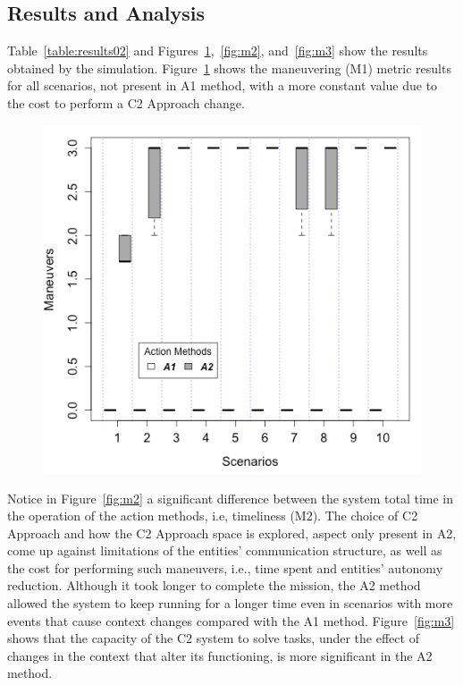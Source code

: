 \subsection{Results and Analysis}

Table~\ref{table:results02} and Figures~\ref{fig:m1},~\ref{fig:m2}, and~\ref{fig:m3} show the results obtained by the simulation. Figure~\ref{fig:m1} shows the maneuvering (M1) metric results for all scenarios, not present in A1 method, with a more constant value due to the cost to perform a C2 Approach change.

\begin{figure}[ht]
\centering
\begin{minipage}{.5\textwidth}
    \centering
    \small
    \fontsize{7}{7}\selectfont
    \label{table:results02}
    
\end{minipage}%
\begin{minipage}{.5\textwidth}
  \centering
  \includegraphics[width=0.95\linewidth]{figures/graphs/Boxplot_M2.png}
  \label{fig:m1}
\end{minipage}
\end{figure}

Notice in Figure~\ref{fig:m2} a significant difference between the system total time in the operation of the action methods, i.e, timeliness (M2). The choice of C2 Approach and how the C2 Approach space is explored, aspect only present in A2, come up against limitations of the entities' communication structure, as well as the cost for performing such maneuvers, i.e., time spent and entities' autonomy reduction. Although it took longer to complete the mission, the A2 method allowed the system to keep running for a longer time even in scenarios with more events that cause context changes compared with the A1 method. Figure~\ref{fig:m3} shows that the capacity of the C2 system to solve tasks, under the effect of changes in the context that alter its functioning, is more significant in the A2 method. 

